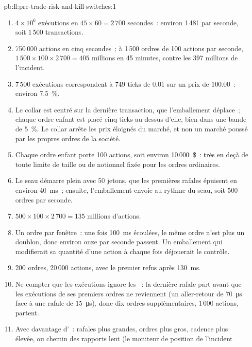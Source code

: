 \begin{solution}{pb:ll:pre-trade-risk-and-kill-switches:1}
\begin{enumerate}
\item $4 \times 10^6$ exécutions en $45 \times 60 = 2\,700$ secondes~: environ 1\,481 par seconde, soit 1\,500 transactions.
\item 750\,000 actions en cinq secondes~; à 1\,500 ordres de 100 actions par seconde, $1\,500 \times 100 \times 2\,700 = 405$ millions
en 45 minutes, contre les 397 millions de l'incident.
\item 7\,500 exécutions correspondent à 749 ticks de 0.01 sur un prix de 100.00~: environ 7.5~\%.
\item Le collar est centré sur la dernière transaction, que l'emballement déplace~; chaque ordre enfant est placé cinq ticks au-dessus d'elle, bien
dans une bande de 5~\%. Le collar arrête les prix éloignés du marché, et non un marché poussé par les propres ordres de la société.
\item Chaque ordre enfant porte 100 actions, soit environ 10\,000~\$~: très en deçà de toute limite de taille ou de notionnel fixée pour les ordres ordinaires.
\item Le seau démarre plein avec 50 jetons, que les premières rafales épuisent en environ \qty{40}{\milli\second}~; ensuite,
l'emballement envoie au rythme du seau, soit 500 ordres par seconde.
\item $500 \times 100 \times 2\,700 = 135$ millions d'actions.
\item Un ordre par fenêtre~: une fois \qty{100}{\milli\second} écoulées, le même ordre n'est plus un doublon, donc environ onze
par seconde passent. Un emballement qui modifierait sa quantité d'une action à chaque fois déjouerait le contrôle.
\item 200 ordres, 20\,000 actions, avec le premier refus après \qty{130}{\milli\second}.
\item Ne compter que les exécutions ignore les ~: la dernière rafale part avant que les exécutions de ses premiers ordres ne reviennent (un
aller-retour de \qty{70}{\micro\second} face à une rafale de \qty{15}{\micro\second}), donc dix ordres supplémentaires, 1\,000 actions, partent.
\item Avec davantage d'~: rafales plus grandes, ordres plus gros, cadence plus élevée, ou chemin des rapports lent (le moniteur de position de l'incident

\end{enumerate}
\end{solution}
